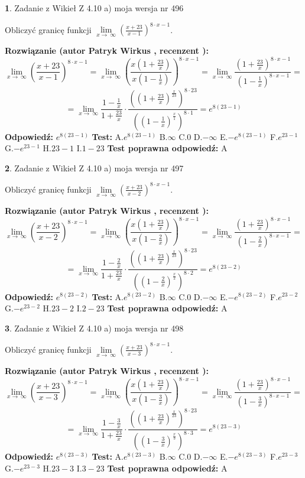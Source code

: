 \documentclass[12pt, a4paper]{article}
\theoremstyle{definition} %
\newtheorem{zad}{}
\newcommand{\zadStart}[1]{\begin{zad}#1\newline}
\newcommand{\zadStop}{\end{zad}}
\newcommand{\rozwStart}[2]{\noindent \textbf{Rozwiązanie (autor #1 , recenzent #2): }\newline}
\newcommand{\rozwStop}{\newline}
\newcommand{\odpStart}{\noindent \textbf{Odpowiedź:}\newline}
\newcommand{\odpStop}{\newline}
\newcommand{\testStart}{\noindent \textbf{Test:}\newline}
\newcommand{\testStop}{\newline}
\newcommand{\kluczStart}{\noindent \textbf{Test poprawna odpowiedź:}\newline}
\newcommand{\kluczStop}{\newline}
\begin{document}
\zadStart{Zadanie z Wikieł Z 4.10 a) moja wersja nr 496}


Obliczyć granicę funkcji  $\lim\limits_{x\to\ \infty}(\frac{x+23}{x-1})^{8\cdot x-1}$.
\zadStop
\rozwStart{Patryk Wirkus}{}
$$\lim\limits_{x\to\ \infty}(\frac{x+23}{x-1})^{8\cdot x-1} = \lim\limits_{x\to\ \infty}(\frac{x(1+\frac{23}{x})}{x(1-\frac{1}{x})})^{8\cdot x-1}=\lim\limits_{x\to\ \infty}\frac{(1+\frac{23}{x})^{8\cdot x-1}}{(1-\frac{1}{x})^{8\cdot x-1}}=$$
$$=\lim\limits_{x\to\ \infty}\frac{1-\frac{1}{x}}{1+\frac{23}{x}}\cdot\frac{((1+\frac{23}{x})^{\frac{x}{23}})^{8\cdot23}}{((1-\frac{1}{x})^{\frac{x}{1}})^{8\cdot1}}=e^{8(23-1)}$$
\rozwStop
\odpStart
$e^{8(23-1)}$
\odpStop
\testStart
A.$e^{8(23-1)}$ B.$\infty$ C.$0$ D.$-\infty$ E.$-e^{8(23-1)}$
F.$e^{23-1}$ G.$-e^{23-1}$
H.$23-1$
I.$1-23$
\testStop
\kluczStart
A
\kluczStop



\zadStart{Zadanie z Wikieł Z 4.10 a) moja wersja nr 497}


Obliczyć granicę funkcji  $\lim\limits_{x\to\ \infty}(\frac{x+23}{x-2})^{8\cdot x-1}$.
\zadStop
\rozwStart{Patryk Wirkus}{}
$$\lim\limits_{x\to\ \infty}(\frac{x+23}{x-2})^{8\cdot x-1} = \lim\limits_{x\to\ \infty}(\frac{x(1+\frac{23}{x})}{x(1-\frac{2}{x})})^{8\cdot x-1}=\lim\limits_{x\to\ \infty}\frac{(1+\frac{23}{x})^{8\cdot x-1}}{(1-\frac{2}{x})^{8\cdot x-1}}=$$
$$=\lim\limits_{x\to\ \infty}\frac{1-\frac{2}{x}}{1+\frac{23}{x}}\cdot\frac{((1+\frac{23}{x})^{\frac{x}{23}})^{8\cdot23}}{((1-\frac{2}{x})^{\frac{x}{2}})^{8\cdot2}}=e^{8(23-2)}$$
\rozwStop
\odpStart
$e^{8(23-2)}$
\odpStop
\testStart
A.$e^{8(23-2)}$ B.$\infty$ C.$0$ D.$-\infty$ E.$-e^{8(23-2)}$
F.$e^{23-2}$ G.$-e^{23-2}$
H.$23-2$
I.$2-23$
\testStop
\kluczStart
A
\kluczStop



\zadStart{Zadanie z Wikieł Z 4.10 a) moja wersja nr 498}


Obliczyć granicę funkcji  $\lim\limits_{x\to\ \infty}(\frac{x+23}{x-3})^{8\cdot x-1}$.
\zadStop
\rozwStart{Patryk Wirkus}{}
$$\lim\limits_{x\to\ \infty}(\frac{x+23}{x-3})^{8\cdot x-1} = \lim\limits_{x\to\ \infty}(\frac{x(1+\frac{23}{x})}{x(1-\frac{3}{x})})^{8\cdot x-1}=\lim\limits_{x\to\ \infty}\frac{(1+\frac{23}{x})^{8\cdot x-1}}{(1-\frac{3}{x})^{8\cdot x-1}}=$$
$$=\lim\limits_{x\to\ \infty}\frac{1-\frac{3}{x}}{1+\frac{23}{x}}\cdot\frac{((1+\frac{23}{x})^{\frac{x}{23}})^{8\cdot23}}{((1-\frac{3}{x})^{\frac{x}{3}})^{8\cdot3}}=e^{8(23-3)}$$
\rozwStop
\odpStart
$e^{8(23-3)}$
\odpStop
\testStart
A.$e^{8(23-3)}$ B.$\infty$ C.$0$ D.$-\infty$ E.$-e^{8(23-3)}$
F.$e^{23-3}$ G.$-e^{23-3}$
H.$23-3$
I.$3-23$
\testStop
\kluczStart
A
\kluczStop
\end{document}
